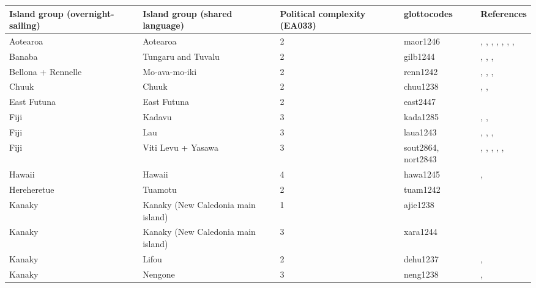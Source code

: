 \begin{longtable}{p{3cm}p{3cm}p{2cm}p{2cm}p{4cm}}
  \toprule
Island group (overnight-sailing) & Island group (shared language) & Political complexity (EA033) & glottocodes & References \\ 
  \midrule
Aotearoa & Aotearoa & 2 & maor1246 & \citet{sahlins1958social}, \citet{sahlins1958social}, \citet{buck1952}, \citet{buck1952}, \citet{kirch1984evolution}, \citet{kirch1984evolution}, \citet{van1995maori}, \citet{van1995maori} \\ 
  Banaba & Tungaru and Tuvalu & 2 & gilb1244 & \citet{lambert1966}, \citet{lambert1975makin}, \citet{lambert1991}, \citet{macdonald1982cinderellas} \\ 
  Bellona + Rennelle & Mo-ava-mo-iki & 2 & renn1242 & \citet{birketsmith1956}, \citet{birketsmith1956}, \citet{monberg1991bellona}, \citet{monberg1991bellona} \\ 
  Chuuk & Chuuk & 2 & chuu1238 & \citet{goodenough1991}, \citet{goodenough2002under}, \citet{mahony1960taro} \\ 
  East Futuna & East Futuna & 2 & east2447 & \citet{kirch1994wet} \\ 
  Fiji & Kadavu & 3 & kada1285 & \citet{kuhlken2002intensive}, \citet{scarr1984fiji}, \citet{walter1978examination} \\ 
  Fiji & Lau & 3 & laua1243 & \citet{hocart_1929}, \citet{quain_1948}, \citet{thompson1940a}, \citet{thompson1940b} \\ 
  Fiji & Viti Levu + Yasawa & 3 & sout2864, nort2843 & \citet{kuhlken2002intensive}, \citet{kuhlken2002intensive}, \citet{scarr1984fiji}, \citet{scarr1984fiji}, \citet{walter1978examination}, \citet{walter1978examination} \\ 
  Hawaii & Hawaii & 4 & hawa1245 & \citet{kirch1994wet}, \citet{kirch2010chiefs} \\ 
  Hereheretue & Tuamotu & 2 & tuam1242 & \citet{emory1975material} \\ 
  Kanaky & Kanaky (New Caledonia main island) & 1 & ajie1238 & \citet{winslow1991} \\ 
  Kanaky & Kanaky (New Caledonia main island) & 3 & xara1244 & \citet{young1991goodenough} \\ 
  Kanaky & Lifou & 2 & dehu1237 & \citet{hadfield_1920}, \citet{ray1917people} \\ 
  Kanaky & Nengone & 3 & neng1238 & \citet{dubois1984gens}, \citet{guiart1952organisation} \\ 

\end{longtable}
